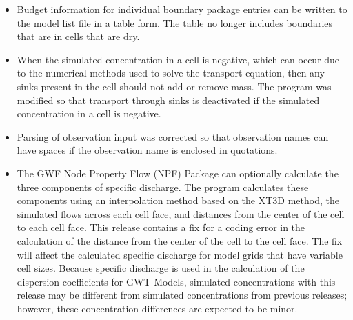 \begin{itemize}
	        \item Budget information for individual boundary package entries can be written to the model list file in a table form.  The table no longer includes boundaries that are in cells that are dry.
	        \item When the simulated concentration in a cell is negative, which can occur due to the numerical methods used to solve the transport equation, then any sinks present in the cell should not add or remove mass.  The program was modified so that transport through sinks is deactivated if the simulated concentration in a cell is negative.
	        \item Parsing of observation input was corrected so that observation names can have spaces if the observation name is enclosed in quotations.
	        \item The GWF Node Property Flow (NPF) Package can optionally calculate the three components of specific discharge.  The program calculates these components using an interpolation method based on the XT3D method, the simulated flows across each cell face, and distances from the center of the cell to each cell face.  This release contains a fix for a coding error in the calculation of the distance from the center of the cell to the cell face.  The fix will affect the calculated specific discharge for model grids that have variable cell sizes.  Because specific discharge is used in the calculation of the dispersion coefficients for GWT Models, simulated concentrations with this release may be different from simulated concentrations from previous releases; however, these concentration differences are expected to be minor.
	\end{itemize}

